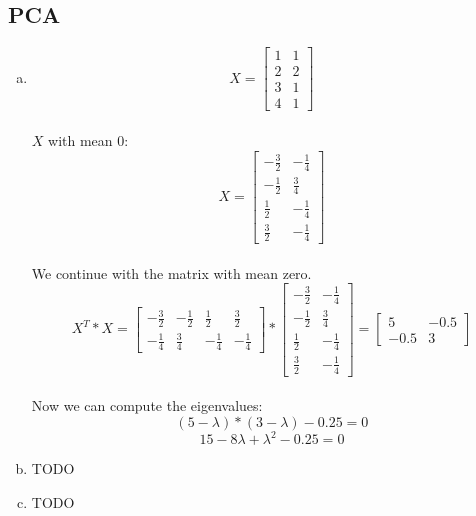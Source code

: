 \documentclass[12pt]{article}
\begin{document}

\setcounter{section}{2}

\subsection{PCA}
\begin{enumerate}[a)]
    \item 
        $$X =\begin{bmatrix} 1&1 \\ 2&2 \\ 3 & 1 \\ 4 & 1 \end{bmatrix}$$\\
        $X$ with mean $0$:\\
        $$X =\begin{bmatrix} -\frac{3}{2}& -\frac{1}{4} \\ -\frac{1}{2}&\frac{3}{4} \\ \frac{1}{2} & -\frac{1}{4} \\ \frac{3}{2} & -\frac{1}{4} \end{bmatrix}$$\\
        We continue with the matrix with mean zero.\\
        $$X^T * X = \begin{bmatrix} -\frac{3}{2}& -\frac{1}{2} & \frac{1}{2} & \frac{3}{2} \\
        				-\frac{1}{4} & \frac{3}{4} & -\frac{1}{4}  & -\frac{1}{4} \end{bmatrix} *
        				\begin{bmatrix} -\frac{3}{2}& -\frac{1}{4} \\ -\frac{1}{2}&\frac{3}{4} \\ \frac{1}{2} & -\frac{1}{4} \\ \frac{3}{2} & -\frac{1}{4} \end{bmatrix} 
        				= \begin{bmatrix}
        					5 & -0.5 \\
        					-0.5 & 3
        				\end{bmatrix}
        				$$\\
        	Now we can compute the eigenvalues:
        		$$ (5 - \lambda)*(3 - \lambda)-0.25 =0$$
        		$$ 15 - 8\lambda + \lambda^2 -0.25 = 0$$
        		
    \item
        TODO
    \item
        TODO
\end{enumerate}
\end{document}

